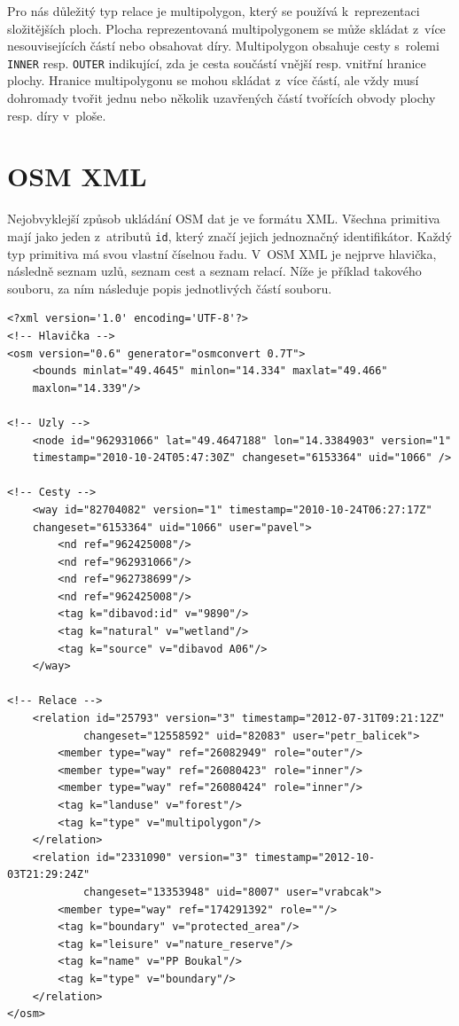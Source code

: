 Pro nás důležitý typ relace je {\tuc multipolygon}, který se používá k~reprezentaci
složitějších ploch. Plocha reprezentovaná multipolygonem se může skládat z~více
nesouvisejících částí nebo obsahovat díry. Multipolygon obsahuje cesty s~rolemi 
\verb|INNER| resp. \verb|OUTER| indikující, zda je cesta součástí vnější resp.
vnitřní hranice plochy. Hranice multipolygonu se mohou skládat z~více částí, ale
vždy musí dohromady tvořit jednu nebo několik uzavřených částí tvořících obvody 
plochy resp. díry v~ploše.

\section{OSM XML}
Nejobvyklejší způsob ukládání OSM dat je ve formátu XML. Všechna primitiva mají
jako jeden z~atributů \verb|id|, který značí jejich jednoznačný identifikátor.
Každý typ primitiva má svou vlastní číselnou řadu. V~OSM XML \cite{osmxml} je
nejprve hlavička, následně seznam uzlů, seznam cest a seznam relací. Níže je
příklad takového souboru, za ním následuje popis jednotlivých částí souboru.

\begin{verbatim}
<?xml version='1.0' encoding='UTF-8'?>
<!-- Hlavička -->
<osm version="0.6" generator="osmconvert 0.7T">
	<bounds minlat="49.4645" minlon="14.334" maxlat="49.466" 
	maxlon="14.339"/>

<!-- Uzly -->
	<node id="962931066" lat="49.4647188" lon="14.3384903" version="1" 
	timestamp="2010-10-24T05:47:30Z" changeset="6153364" uid="1066" />

<!-- Cesty -->
	<way id="82704082" version="1" timestamp="2010-10-24T06:27:17Z" 
	changeset="6153364" uid="1066" user="pavel">
	    <nd ref="962425008"/>
	    <nd ref="962931066"/>
	    <nd ref="962738699"/>
	    <nd ref="962425008"/>
	    <tag k="dibavod:id" v="9890"/>
	    <tag k="natural" v="wetland"/>
	    <tag k="source" v="dibavod A06"/>
	</way>

<!-- Relace -->
	<relation id="25793" version="3" timestamp="2012-07-31T09:21:12Z" 
			changeset="12558592" uid="82083" user="petr_balicek">
	    <member type="way" ref="26082949" role="outer"/>
	    <member type="way" ref="26080423" role="inner"/>
	    <member type="way" ref="26080424" role="inner"/>
	    <tag k="landuse" v="forest"/>
	    <tag k="type" v="multipolygon"/>
	</relation>
	<relation id="2331090" version="3" timestamp="2012-10-03T21:29:24Z"
			changeset="13353948" uid="8007" user="vrabcak">
	    <member type="way" ref="174291392" role=""/>
	    <tag k="boundary" v="protected_area"/>
	    <tag k="leisure" v="nature_reserve"/>
	    <tag k="name" v="PP Boukal"/>
	    <tag k="type" v="boundary"/>
	</relation>
</osm>
\end{verbatim}

